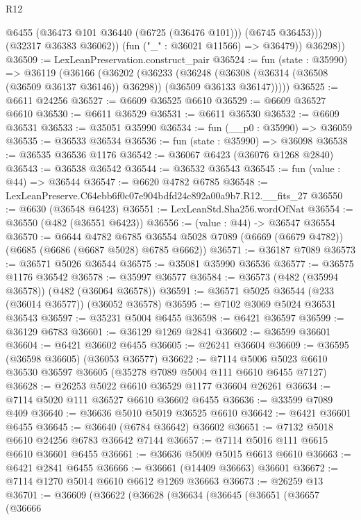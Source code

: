 \begin{lexlean}{R12}
\begin{coremodule}
                @6455
                (@36473 @101 @36440 (@6725 (@36476 @101)))
                (@6745 @36453)))
            (@32317 @36383 @36062))
          (fun ("_" : @36021 @11566) => @36479))
        @36298))
@36509 := LexLeanPreservation.construct_pair
@36524 := fun (state : @35990) =>
  @36119
    (@36166
      (@36202
        (@36233
          (@36248
            (@36308 (@36314 (@36508 (@36509 @36137 @36146)) @36298))
            (@36509 @36133 @36147)))))
@36525 := @6611 @24256
@36527 := @6609 @36525 @6610
@36529 := @6609 @36527 @6610
@36530 := @6611 @36529
@36531 := @6611 @36530
@36532 := @6609 @36531
@36533 := @35051 @35990
@36534 := fun (__p0 : @35990) => @36059
@36535 := @36533 @36534
@36536 := fun (state : @35990) => @36098
@36538 := @36535 @36536 @1176
@36542 := @36067 @6423 (@36076 @1268 @2840)
@36543 := @36538 @36542
@36544 := @36532 @36543
@36545 := fun (value : @44) => @36544
@36547 := @6620 @4782 @6785
@36548 := LexLeanPreserve.C64ebb6f0c07e904bdfd24c892a00a9b7.R12.__fits_27
@36550 := @6630 (@36548 @6423)
@36551 := LexLeanStd.Sha256.wordOfNat
@36554 := @36550 (@482 (@36551 @6423))
@36556 := (value : @44) -> @36547 @36554
@36570 := @6644
    @4782
    @6785
    @36554
    @5028
    @7089
    (@6669 (@6679 @4782))
    (@6685 (@6686 (@6687 @5028) @6785 @6662))
@36571 := @36187 @7089
@36573 := @36571 @5026 @36544
@36575 := @35081 @35990 @36536
@36577 := @36575 @1176 @36542
@36578 := @35997 @36577
@36584 := @36573 (@482 (@35994 @36578)) (@482 (@36064 @36578))
@36591 := @36571 @5025 @36544 (@233 (@36014 @36577)) (@36052 @36578)
@36595 := @7102 @3069 @5024 @36531 @36543
@36597 := @35231 @5004 @6455
@36598 := @6421 @36597
@36599 := @36129 @6783
@36601 := @36129 @1269 @2841
@36602 := @36599 @36601
@36604 := @6421 @36602 @6455
@36605 := @26241 @36604
@36609 := @36595 (@36598 @36605) (@36053 @36577)
@36622 := @7114 @5006 @5023 @6610 @36530 @36597 @36605 (@35278 @7089 @5004 @111 @6610 @6455 @7127)
@36628 := @26253 @5022 @6610 @36529 @1177 @36604 @26261
@36634 := @7114 @5020 @111 @36527 @6610 @36602 @6455
@36636 := @33599 @7089 @409
@36640 := @36636 @5010 @5019 @36525 @6610
@36642 := @6421 @36601 @6455
@36645 := @36640 (@6784 @36642) @36602
@36651 := @7132 @5018 @6610 @24256 @6783 @36642 @7144
@36657 := @7114 @5016 @111 @6615 @6610 @36601 @6455
@36661 := @36636 @5009 @5015 @6613 @6610
@36663 := @6421 @2841 @6455
@36666 := @36661 (@14409 @36663) @36601
@36672 := @7114 @1270 @5014 @6610 @6612 @1269 @36663
@36673 := @26259 @13
@36701 := @36609
    (@36622
      (@36628
        (@36634
          (@36645
            (@36651
              (@36657
                (@36666

\end{coremodule}
\end{lexlean}
